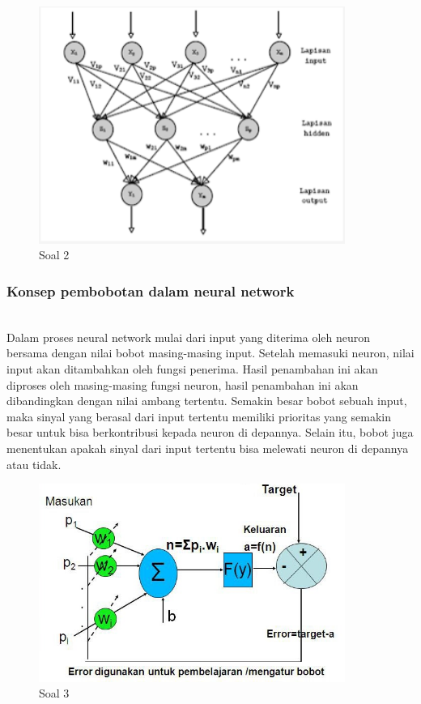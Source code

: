 	\begin{figure}[H]
		\begin{center}
		 \includegraphics[width=10cm]{figures/1174076/figures6/teori2.png}
		 \caption{Soal 2}	
		\end{center}
	\end{figure}
	 
	\subsubsection{Konsep pembobotan dalam neural network}
	\hfill\\
Dalam proses neural network mulai dari input yang diterima oleh neuron bersama dengan nilai bobot masing-masing input. Setelah memasuki neuron, nilai input akan ditambahkan oleh fungsi penerima. Hasil penambahan ini akan diproses oleh masing-masing fungsi neuron, hasil penambahan ini akan dibandingkan dengan nilai ambang tertentu. Semakin besar bobot sebuah input, maka sinyal yang berasal dari input tertentu memiliki prioritas yang semakin besar untuk bisa berkontribusi kepada neuron di depannya. Selain itu, bobot juga menentukan apakah sinyal dari input tertentu bisa melewati neuron di depannya atau tidak.

	\begin{figure}[H]
		\begin{center}
		 \includegraphics[width=10cm]{figures/1174076/figures6/teori3.png}
		 \caption{Soal 3}	
		\end{center}
	\end{figure}
	 
